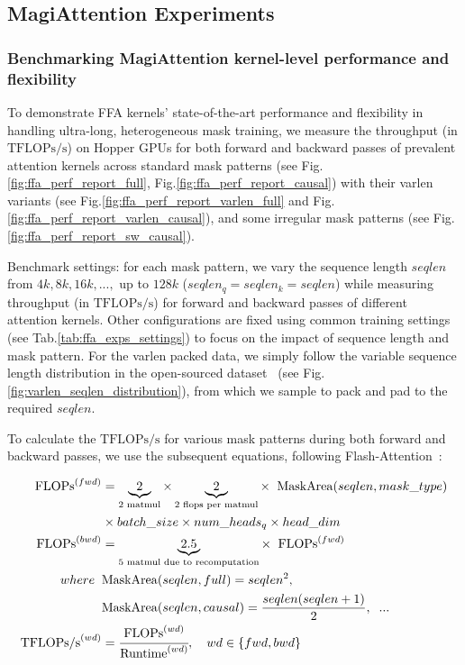 \subsection{MagiAttention Experiments}\label{appendix:magiattn_exps}

\subsubsection{Benchmarking MagiAttention kernel-level performance and flexibility}\label{appendix:magiattn_exps_ffa}

To demonstrate FFA kernels' state-of-the-art performance and flexibility in handling ultra-long, heterogeneous mask training, we measure the throughput (in $\mathrm{TFLOPs/s}$) on Hopper GPUs for both forward and backward passes of prevalent attention kernels across standard mask patterns (see Fig.\ref{fig:ffa_perf_report_full}, Fig.\ref{fig:ffa_perf_report_causal}) with their varlen variants (see Fig.\ref{fig:ffa_perf_report_varlen_full} and Fig.\ref{fig:ffa_perf_report_varlen_causal}), 
and some irregular mask patterns (see Fig.\ref{fig:ffa_perf_report_sw_causal}).


Benchmark settings: for each mask pattern, we vary the sequence length $seqlen$ from $4k,8k,16k,...,$ up to $128k$ ($seqlen_q = seqlen_k = seqlen$) while measuring throughput (in $\mathrm{TFLOPs/s}$) for forward and backward passes of different attention kernels. Other configurations are fixed using common training settings (see Tab.\ref{tab:ffa_exps_settings}) to focus on the impact of sequence length and mask pattern. For the varlen packed data, we simply follow the variable sequence length distribution in the open-sourced dataset~\citep{xu2024chatqa} (see Fig.\ref{fig:varlen_seqlen_distribution}), from which we sample to pack and pad to the required $seqlen$.

To calculate the $\mathrm{TFLOPs/s}$ for various mask patterns during both forward and backward passes, we use the subsequent equations, following Flash-Attention~\citep{dao2023flashattention}:

\begin{align}
    \mathrm{FLOPs}^{(fwd)} &= \underbrace{2}_{\text{2 matmul}} \times \underbrace{2}_{\text{2 flops per matmul}} \times\;\; \mathrm{MaskArea}(seqlen, mask\_type) \label{eq:flops_fwd}\\
    &\times batch\_size \times num\_heads_q \times head\_dim \nonumber\\
    \mathrm{FLOPs}^{(bwd)} &= \underbrace{2.5}_{\text{5 matmul due to recomputation}} \times\;\; \mathrm{FLOPs}^{(fwd)} \label{eq:flops_bwd}\\
    where \;\;& \mathrm{MaskArea}(seqlen, full) = seqlen^2, \nonumber\\
     \;\;& \mathrm{MaskArea}(seqlen, causal) = \frac{seqlen(seqlen+1)}{2}, \;\; ...\nonumber \\
     \mathrm{TFLOPs/s}^{(wd)} &= \cfrac{\mathrm{FLOPs}^{(wd)}}{\mathrm{Runtime}^{(wd)}}, \quad wd \in \{fwd, bwd\}
\end{align}

